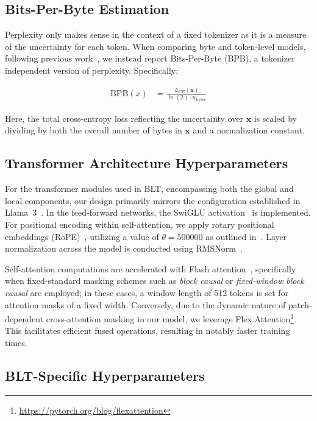 \subsection{Bits-Per-Byte Estimation} Perplexity only makes sense in the context of a fixed tokenizer as it is a measure of the uncertainty for each token. When comparing byte and token-level models, following previous work~\citep{xue2022byt5, yu2023megabyte, wang2024mambabyte}, we instead report Bits-Per-Byte (BPB), a tokenizer independent version of perplexity. Specifically:

\begin{align}
    \text{BPB}(x)&= \frac{\mathcal{L}_{CE}(\pmb{x})}{\ln(2)\cdot n_{\text{bytes}}}
\end{align}

Here, the total cross-entropy loss reflecting the uncertainty over $\pmb{x}$ is scaled by dividing by both the overall number of bytes in $\pmb{x}$ and a normalization constant.

\subsection{Transformer Architecture Hyperparameters} 

For the transformer modules used in {\textsc BLT}, encompassing both the global and local components, our design primarily mirrors the configuration established in Llama~3~\citep{dubey2024llama}. In the feed-forward networks, the SwiGLU activation~\citep{swiglu} is implemented. For positional encoding within self-attention, we apply rotary positional embeddings (RoPE)~\citep{RoPe}, utilizing a value of $\theta=500000$ as outlined in~\citep{xiong2024effective}. Layer normalization across the model is conducted using RMSNorm~\citep{RMSNorm}. 

Self-attention computations are accelerated with Flash attention~\citep{dao2022flashattention}, specifically when fixed-standard masking schemes such as \textit{block causal} or \textit{fixed-window block causal} are employed; in these cases, a window length of 512 tokens is set for attention masks of a fixed width. Conversely, due to the dynamic nature of patch-dependent cross-attention masking in our model, we leverage Flex Attention\footnote{\url{https://pytorch.org/blog/flexattention}}. This facilitates efficient fused operations, resulting in notably faster training times.

\subsection{{\textsc BLT}-Specific Hyperparameters} 

